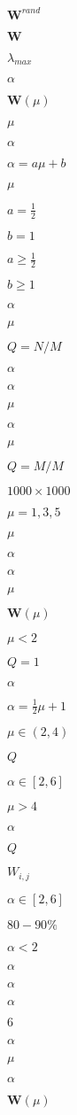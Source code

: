 $\mathbf{W}^{rand}$

$\mathbf{W}$

$\lambda_{max}$

$\alpha$

$\mathbf{W}(\mu)$

$\mu$

$\alpha$

$\alpha=a\mu+b$

$\mu$

$a=\tfrac{1}{2}$

$b=1$

$a\ge \tfrac{1}{2}$

$b\ge 1$

$\alpha$

$\mu$

$Q=N/M$

$\alpha$

$\alpha$

$\mu$

$\alpha$

$\mu$

$Q=M/M$

$1000\times1000$

$\mu=1,3,5$

$\mu$

$\alpha$

$\alpha$

$\mu$

$\mathbf{W}(\mu)$

$\mu<2$

$Q=1$

$\alpha$

$\alpha=\frac{1}{2}\mu+1$

$\mu \in (2,4)$

$Q$

$\alpha\in[2,6]$

$\mu>4$

$\alpha$

$Q$

$W_{i,j}$

$\alpha\in [2,6]$

$80-90\%$

$\alpha<2$

$\alpha$

$\alpha$

$\alpha$

$6$

$\alpha$

$\mu$

$\alpha$

$\mathbf{W}(\mu)$

